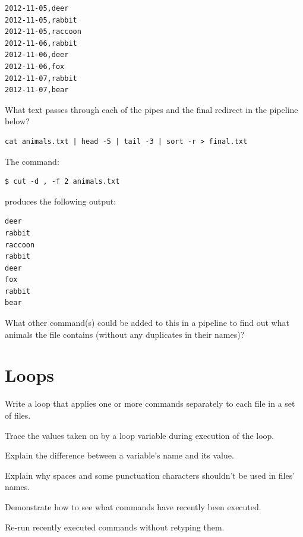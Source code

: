 \documentclass{book}
\begin{document}
\begin{swcenumerate}
\begin{verbatim}
2012-11-05,deer
2012-11-05,rabbit
2012-11-05,raccoon
2012-11-06,rabbit
2012-11-06,deer
2012-11-06,fox
2012-11-07,rabbit
2012-11-07,bear
\end{verbatim}

  What text passes through each of the pipes and the final redirect in
  the pipeline below?

\begin{verbatim}
cat animals.txt | head -5 | tail -3 | sort -r > final.txt
\end{verbatim}
\item
  The command:

\begin{verbatim}
$ cut -d , -f 2 animals.txt
\end{verbatim}

  produces the following output:

\begin{verbatim}
deer
rabbit
raccoon
rabbit
deer
fox
rabbit
bear
\end{verbatim}

  What other command(s) could be added to this in a pipeline to find out
  what animals the file contains (without any duplicates in their
  names)?
\end{swcenumerate}

\section{Loops}

\begin{objectives}
\begin{swcitemize}
\item
  Write a loop that applies one or more commands separately to each file
  in a set of files.
\item
  Trace the values taken on by a loop variable during execution of the
  loop.
\item
  Explain the difference between a variable's name and its value.
\item
  Explain why spaces and some punctuation characters shouldn't be used
  in files' names.
\item
  Demonstrate how to see what commands have recently been executed.
\item
  Re-run recently executed commands without retyping them.
\end{swcitemize}
\end{objectives}
\end{document}
